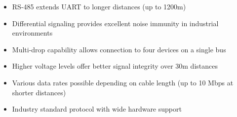 \begin{example}
   \begin{itemize}
     \item RS-485 extends UART to longer distances (up to 1200m)
     \item Differential signaling provides excellent noise immunity in industrial environments
     \item Multi-drop capability allows connection to four devices on a single bus
     \item Higher voltage levels offer better signal integrity over 30m distances
     \item Various data rates possible depending on cable length (up to 10 Mbps at shorter distances)
     \item Industry standard protocol with wide hardware support
   \end{itemize}
\end{example}







